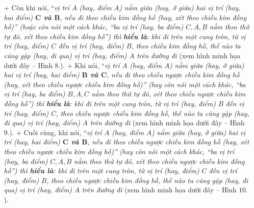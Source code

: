 	+ Còn khi nói, “\textit{vị trí $A$ (\textnormal{hay}, điểm $A$) nằm giữa (\textnormal{hay}, ở giữa) hai vị trí (\textnormal{hay}, hai điểm) \textbf{$\pmb C$ và $\pmb B$}, nếu đi theo chiều kim đồng hồ (\textnormal{hay}, xét theo chiều kim đồng hồ)” (\textnormal{hoặc còn} nói một cách khác, “ba vị trí (\textnormal{hay}, ba điểm) $C, A, B$ nằm theo thứ tự đó, xét theo chiều kim đồng hồ”) thì \textbf{hiểu là}: khi đi trên một cung tròn, từ vị trí (\textnormal{hay}, điểm) $C$ đến vị trí (\textnormal{hay}, điểm) $B$, theo chiều kim đồng hồ, thế nào ta cũng gặp (\textnormal{hay}, đi qua) vị trí (\textnormal{hay}, điểm) $A$ trên đường đi} (xem hình minh họa dưới đây -- Hình $8.$).
	\vskip 0.1cm
	+ Khi nói, “\textit{vị trí $A$ (\textnormal{hay}, điểm $A$) nằm giữa (\textnormal{hay}, ở giữa) hai vị trí (\textnormal{hay}, hai điểm) \textbf{$\pmb B$ và $\pmb C$}, nếu đi theo chiều ngược chiều kim đồng hồ (\textnormal{hay}, xét theo chiều ngược chiều kim đồng hồ)” (\textnormal{hay còn} nói một cách khác, “ba vị trí (\textnormal{hay}, ba điểm) $B, A, C$ nằm theo thứ tự đó, xét theo chiều ngược chiều kim đồng hồ”) thì \textbf{hiểu là}: khi đi trên một cung tròn, từ vị trí (\textnormal{hay}, điểm) $B$ đến vị trí (\textnormal{hay}, điểm) $C$, theo chiều ngược chiều kim đồng hồ, thế nào ta cũng gặp (\textnormal{hay}, đi qua) vị trí (\textnormal{hay}, điểm) $A$ trên đường đi} (xem hình minh họa dưới đây -- Hình $9.$).
	\vskip 0.1cm
	+ Cuối cùng, khi nói, “\textit{vị trí $A$ (\textnormal{hay}, điểm $A$) nằm giữa (\textnormal{hay}, ở giữa) hai vị trí (\textnormal{hay}, hai điểm) \textbf{$\pmb C$ và $\pmb B$}, nếu đi theo chiều ngược chiều kim đồng hồ (\textnormal{hay}, xét theo chiều ngược chiều kim đồng hồ)” (\textnormal{hay còn} nói một cách khác, “ba vị trí (\textnormal{hay}, ba điểm) $C, A, B$ nằm theo thứ tự đó, xét theo chiều ngược chiều kim đồng hồ”) thì \textbf{hiểu là}: khi đi trên một cung tròn, từ vị trí (\textnormal{hay}, điểm) $C$ đến vị trí (\textnormal{hay}, điểm) $B$, theo chiều ngược chiều kim đồng hồ, thế nào ta cũng gặp (\textnormal{hay}, đi qua) vị trí (\textnormal{hay}, điểm) $A$ trên đường đi} (xem hình minh họa dưới đây -- Hình $10.$).
